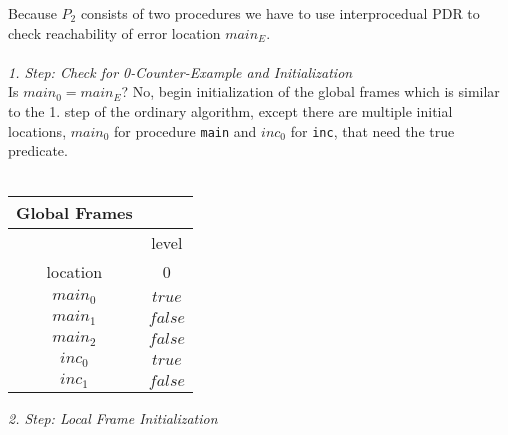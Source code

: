 \documentclass{article}
\begin{document}
	Because $P_2$ consists of two procedures we have to use interprocedual PDR to check reachability of error location $main_E$. \\ \\
	
	\textsl{1. Step: Check for 0-Counter-Example and Initialization} \\
	Is $main_0 = main_E$? No, begin initialization of the global frames which is similar to the 1. step of the ordinary algorithm, except there are multiple initial locations, $main_0$ for procedure \texttt{main} and $inc_0$ for \texttt{inc}, that need the true predicate. \\ \\
	
	\setlength\tabcolsep{0.35em}
	\begin{center}
		\begin{tabu}{cc}
			Global Frames \\
			\toprule
			& level \\
			\cmidrule(lr){2-2}
			location & 0 \\
			$main_0$ & $true$ \\
			$main_1$ & $false$ \\
			$main_2$ & $false$ \\
			$inc_0$ & $true$ \\
			$inc_1$ & $false$\\
			\bottomrule
		\end{tabu}
	\end{center}
	
	\vspace*{1em}
	\textsl{2. Step: Local Frame Initialization} \\
	
\end{document}
